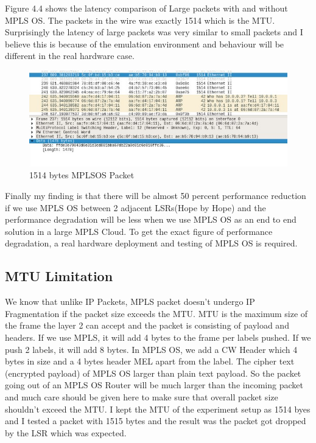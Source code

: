 Figure 4.4 shows the latency comparison of Large packets with and without MPLS OS. The packets in the wire was exactly 1514 which is the MTU. Surprisingly the latency of large packets was very similar to small packets and I believe this is because of the emulation environment and behaviour will be different in the real hardware case.\\

\begin{figure}
       \centering\includegraphics[width=\textwidth]{Final/mplsos_1514.jpg}
       \caption{1514 bytes MPLSOS Packet}
       \label{fig:compbest}
\end{figure}

Finally my finding is that there will be almost 50 percent performance reduction if we use MPLS OS between 2 adjacent LSRs(Hope by Hope) and the performance degradation will be less when we use MPLS OS as an end to end solution in a large MPLS Cloud. To get the exact figure of performance degradation, a real hardware deployment and testing of MPLS OS is required.\\

\subsection{MTU Limitation}

We know that unlike IP Packets, MPLS packet doesn’t undergo IP Fragmentation if the packet size exceeds the MTU. MTU is the maximum size of the frame the layer 2 can accept and the packet is consisting of payload and headers. If we use MPLS, it will add 4 bytes to the frame per labels pushed. If we push 2 labels, it will add 8 bytes. In MPLS OS, we add a CW Header which 4 bytes in size and a 4 bytes header MEL apart from the label. The cipher text (encrypted payload) of MPLS OS larger than plain text payload. So the packet going out of an MPLS OS Router will be much larger than the incoming packet and much care should be given here to make sure that overall packet size shouldn’t exceed the MTU. I kept the MTU of the experiment setup as 1514 byes and I tested a packet with 1515 bytes and the result was the packet got dropped by the LSR which was expected. \\


